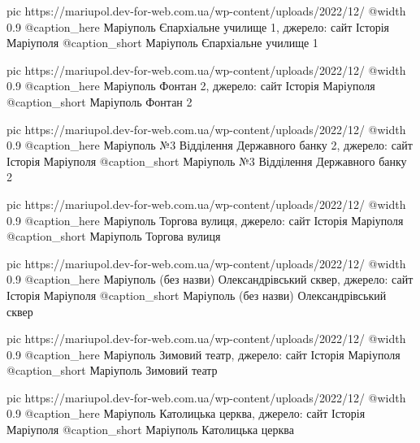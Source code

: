   pic https://mariupol.dev-for-web.com.ua/wp-content/uploads/2022/12/%
  @width 0.9
  @caption_here Маріуполь Єпархіальне училище 1, джерело: сайт Історія Маріуполя
  @caption_short Маріуполь Єпархіальне училище 1

  pic https://mariupol.dev-for-web.com.ua/wp-content/uploads/2022/12/%
  @width 0.9
  @caption_here Маріуполь Фонтан 2, джерело: сайт Історія Маріуполя
  @caption_short Маріуполь Фонтан 2

  pic https://mariupol.dev-for-web.com.ua/wp-content/uploads/2022/12/%
  @width 0.9
  @caption_here Маріуполь №3 Відділення Державного банку 2, джерело: сайт Історія Маріуполя
  @caption_short Маріуполь №3 Відділення Державного банку 2

  pic https://mariupol.dev-for-web.com.ua/wp-content/uploads/2022/12/%
  @width 0.9
  @caption_here Маріуполь Торгова вулиця, джерело: сайт Історія Маріуполя
  @caption_short Маріуполь Торгова вулиця

  pic https://mariupol.dev-for-web.com.ua/wp-content/uploads/2022/12/%
  @width 0.9
  @caption_here Маріуполь (без назви) Олександрівський сквер, джерело: сайт Історія Маріуполя
  @caption_short Маріуполь (без назви) Олександрівський сквер

  pic https://mariupol.dev-for-web.com.ua/wp-content/uploads/2022/12/%
  @width 0.9
  @caption_here Маріуполь Зимовий театр, джерело: сайт Історія Маріуполя
  @caption_short Маріуполь Зимовий театр

  pic https://mariupol.dev-for-web.com.ua/wp-content/uploads/2022/12/%
  @width 0.9
  @caption_here Маріуполь Католицька церква, джерело: сайт Історія Маріуполя
  @caption_short Маріуполь Католицька церква

